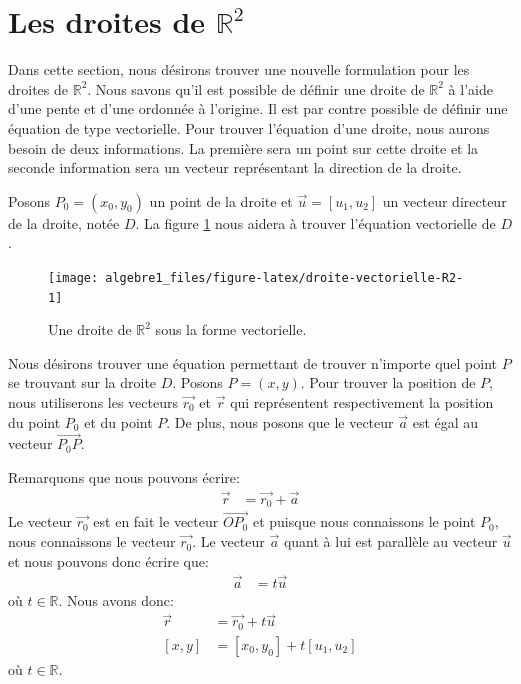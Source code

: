\documentclass[]{book}
\theoremstyle{definition}
\theoremstyle{definition}
\theoremstyle{definition}
\theoremstyle{remark}
\begin{document}
\hypertarget{les-droites-de-mathbbr2}{%
\section{\texorpdfstring{Les droites de \(\mathbb{R}^2\)}{Les droites de \textbackslash{}mathbb\{R\}\^{}2}}\label{les-droites-de-mathbbr2}}

Dans cette section, nous désirons trouver une nouvelle formulation pour les droites de \(\mathbb{R}^2\). Nous savons qu'il est possible de définir une droite de \(\mathbb{R}^2\) à l'aide d'une pente et d'une ordonnée à l'origine. Il est par contre possible de définir une équation de type vectorielle. Pour trouver l'équation d'une droite, nous aurons besoin de deux informations. La première sera un point sur cette droite et la seconde information sera un vecteur représentant la direction de la droite.

Posons \(P_0=(x_0,y_0)\) un point de la droite et \(\overrightarrow{u}=[u_1,u_2]\) un vecteur directeur de la droite, notée \(D\). La figure \ref{fig:droite-vectorielle-R2} nous aidera à trouver l'équation vectorielle de \(D\).

\begin{figure}

{\centering \texttt{[image: algebre1\_files/figure-latex/droite-vectorielle-R2-1]} 

}

\caption{Une droite de $\mathbb{R}^2$ sous la forme vectorielle.}\label{fig:droite-vectorielle-R2}
\end{figure}

Nous désirons trouver une équation permettant de trouver n'importe quel point \(P\) se trouvant sur la droite \(D\). Posons \(P=(x,y)\). Pour trouver la position de \(P\), nous utiliserons les vecteurs \(\overrightarrow{r_0}\) et \(\overrightarrow{r}\) qui représentent respectivement la position du point \(P_0\) et du point \(P\). De plus, nous posons que le vecteur \(\overrightarrow{a}\) est égal au vecteur \(\overrightarrow{P_0 P}\).

Remarquons que nous pouvons écrire:
\begin{align*}
\overrightarrow{r} &= \overrightarrow{r_0}+\overrightarrow{a}
\end{align*}
Le vecteur \(\overrightarrow{r_0}\) est en fait le vecteur \(\overrightarrow{OP_0}\) et puisque nous connaissons le point \(P_0\), nous connaissons le vecteur \(\overrightarrow{r_0}\). Le vecteur \(\overrightarrow{a}\) quant à lui est parallèle au vecteur \(\overrightarrow{u}\) et nous pouvons donc écrire que:
\begin{align*}
\overrightarrow{a} &= t\overrightarrow{u}
\end{align*}
où \(t\in\mathbb{R}\). Nous avons donc:
\begin{align*}
\overrightarrow{r} &= \overrightarrow{r_0}+t\overrightarrow{u} \\
[x,y] &= [x_0,y_0]+t[u_1,u_2]
\end{align*}
où \(t\in\mathbb{R}\).
\end{document}
